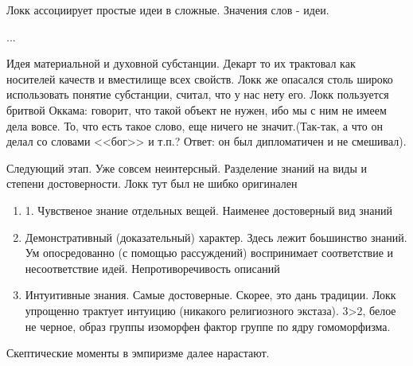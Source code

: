 Локк ассоциирует простые идеи в сложные. Значения слов - идеи.

...

Идея материальной и духовной субстанции. Декарт то их трактовал как носителей качеств и вместилище всех свойств. Локк же опасался столь широко использовать понятие субстанции, считал, что у нас нету его. Локк пользуется бритвой Оккама: говорит, что такой объект не нужен, ибо мы с ним не имеем дела вовсе. То, что есть такое слово, еще ничего не значит.(Так-так, а что он делал со словами <<бог>> и т.п.? Ответ: он был дипломатичен и не смешивал).

Следующий этап. Уже совсем неинтерсный. Разделение знаний на виды и степени достоверности. Локк тут был не шибко оригинален

\begin{enumerate}
	\item 1. Чувственое знание отдельных вещей.  Наименее достоверный вид знаний
	\item Демонстративный (доказательный) характер. Здесь лежит боьшинство знаний. Ум опосредованно (с помощью рассуждений) воспринимает соответствие и несоответствие идей. Непротиворечивость описаний
	\item Интуитивные знания. Самые достоверные. Скорее, это дань традиции. Локк упрощенно трактует интуицию (никакого религиозного экстаза). 3>2, белое не черное, образ группы изоморфен фактор группе по ядру гомоморфизма.
\end{enumerate}
	
Скептические моменты в эмпиризме далее нарастают.
